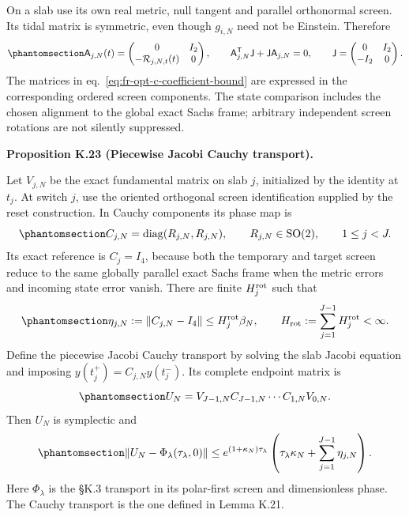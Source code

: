 \documentclass[
  english,
  11pt,
  reqno]{amsart}
\makeatletter
\newcommand{\pandocstatementheading}[1]{%
  \par\addpenalty{\@beginparpenalty}%
  \addvspace{.5\baselineskip plus .2\baselineskip minus .2\baselineskip}%
  {\normalfont\bfseries #1\par}%
  \nobreak\@afterindenttrue\@afterheading
}
\makeatother
\begin{document}
On a slab use its own real metric, null tangent and parallel orthonormal
screen. Its tidal matrix is symmetric, even though \(g_{i,N}\) need not
be Einstein. Therefore
\begin{equation}\protect\phantomsection\label{eq:fr-opt-c-local-hamiltonian}{
 \mathsf A_{j,N}(t)=
 \begin{pmatrix}0&I_2\\-\mathcal R_{j,N,t}(t)&0\end{pmatrix},
 \qquad
 \mathsf A_{j,N}^{\mathsf T}\mathsf J+
                  \mathsf J\mathsf A_{j,N}=0,
 \qquad
 \mathsf J=\begin{pmatrix}0&I_2\\-I_2&0\end{pmatrix}.
}\end{equation} The matrices in eq.~\ref{eq:fr-opt-c-coefficient-bound}
are expressed in the corresponding ordered screen components. The state
comparison includes the chosen alignment to the global exact Sachs
frame; arbitrary independent screen rotations are not silently
suppressed.

\pandocstatementheading{\protect{}\label{prop:fr-opt-c-phase-accumulation}Proposition K.23 (Piecewise Jacobi Cauchy transport).}

Let \(V_{j,N}\) be the exact fundamental matrix on slab \(j\),
initialized by the identity at \(t_j\). At switch \(j\), use the
oriented orthogonal screen identification supplied by the reset
construction. In Cauchy components its phase map is
\begin{equation}\protect\phantomsection\label{eq:fr-opt-c-screen-jump}{
 C_{j,N}=\operatorname{diag}(R_{j,N},R_{j,N}),
 \qquad R_{j,N}\in\operatorname{SO}(2),
 \qquad 1\le j<J.
}\end{equation} Its exact reference is \(C_j=I_4\), because both the
temporary and target screen reduce to the same globally parallel exact
Sachs frame when the metric errors and incoming state error vanish.
There are finite \(H_j^{\rm rot}\) such that
\begin{equation}\protect\phantomsection\label{eq:fr-opt-c-jump-error}{
 \eta_{j,N}:=\|C_{j,N}-I_4\|
 \le H_j^{\rm rot}\beta_N,\qquad
 H_{\rm rot}:=\sum_{j=1}^{J-1}H_j^{\rm rot}<\infty.
}\end{equation} Define the piecewise Jacobi Cauchy transport by solving
the slab Jacobi equation and imposing \(y(t_j^+)=C_{j,N}y(t_j^-)\). Its
complete endpoint matrix is
\begin{equation}\protect\phantomsection\label{eq:fr-opt-c-global-transport}{
 U_N=V_{J-1,N}C_{J-1,N}\cdots C_{1,N}V_{0,N}.
}\end{equation} Then \(U_N\) is symplectic and
\begin{equation}\protect\phantomsection\label{eq:fr-opt-c-product-error}{
 \|U_N-\Phi_\lambda(\tau_\lambda,0)\|
 \le e^{(1+\kappa_N)\tau_\lambda}
       \left(\tau_\lambda\kappa_N+
                    \sum_{j=1}^{J-1}\eta_{j,N}\right).
}\end{equation} Here \(\Phi_\lambda\) is the §K.3 transport in its
polar-first screen and dimensionless phase. The Cauchy transport is the
one defined in Lemma K.21.
\end{document}
